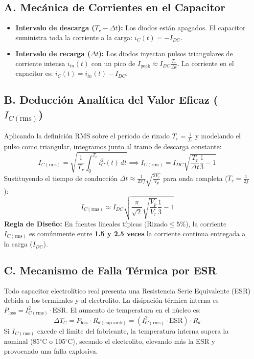 \documentclass[11pt, a4paper]{article}
\begin{document}
\subsection{A. Mecánica de Corrientes en el Capacitor}
\begin{itemize}
    \item \textbf{Intervalo de descarga ($T_r - \Delta t$):} Los diodos están apagados. El capacitor suministra toda la corriente a la carga: $i_C(t) = -I_{DC}$.
    \item \textbf{Intervalo de recarga ($\Delta t$):} Los diodos inyectan pulsos triangulares de corriente intensa $i_{in}(t)$ con un pico de $I_{\text{peak}} \approx I_{DC}\frac{T_r}{\Delta t}$. La corriente en el capacitor es: $i_C(t) = i_{in}(t) - I_{DC}$.
\end{itemize}

\subsection{B. Deducción Analítica del Valor Eficaz ($I_{C(\text{rms})}$)}
Aplicando la definición RMS sobre el periodo de rizado $T_r = \frac{1}{f_r}$ y modelando el pulso como triangular, integramos junto al tramo de descarga constante:
\begin{equation}
    I_{C(\text{rms})} = \sqrt{\frac{1}{T_r} \int_0^{T_r} i_C^2(t) \, dt} \implies I_{C(\text{rms})} = I_{DC} \sqrt{\frac{T_r}{\Delta t} \frac{1}{3} - 1} 
\end{equation}
Sustituyendo el tiempo de conducción $\Delta t \approx \frac{1}{2\pi f} \sqrt{\frac{2V_r}{V_p}}$ para onda completa ($T_r = \frac{1}{2f}$):
\begin{equation}
    I_{C(\text{rms})} \approx I_{DC} \sqrt{\frac{\pi}{\sqrt{2}} \sqrt{\frac{V_p}{V_r}} \frac{1}{3} - 1}
\end{equation}
\textbf{Regla de Diseño:} En fuentes lineales típicas ($\text{Rizado} \le 5\%$), la corriente $I_{C(\text{rms})}$ es comúnmente entre \textbf{1.5 y 2.5 veces} la corriente continua entregada a la carga ($I_{DC}$).

\subsection{C. Mecanismo de Falla Térmica por ESR}
Todo capacitor electrolítico real presenta una Resistencia Serie Equivalente (ESR) debida a los terminales y al electrolito. La disipación térmica interna es $P_{\text{loss}} = I_{C(\text{rms})}^2 \cdot \text{ESR}$. El aumento de temperatura en el núcleo es:
\begin{equation}
    \Delta T_C = P_{\text{loss}} \cdot R_{\theta(\text{cap-amb})} = (I_{C(\text{rms})}^2 \cdot \text{ESR}) \cdot R_{\theta}
\end{equation}
Si $I_{C(\text{rms})}$ excede el límite del fabricante, la temperatura interna supera la nominal (85$^\circ$C o 105$^\circ$C), secando el electrolito, elevando más la ESR y provocando una falla explosiva.
\end{document}
